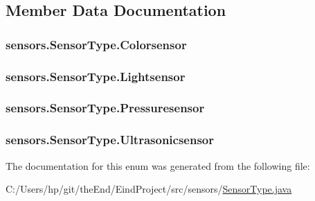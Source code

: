 \subsection{Member Data Documentation}
\hypertarget{enumsensors_1_1_sensor_type_a56c9a2b279f1d909323b79f8ef272ff7}{
\subsubsection[{Colorsensor}]{\setlength{\rightskip}{0pt plus 5cm}sensors.\-Sensor\-Type.\-Colorsensor}}\label{enumsensors_1_1_sensor_type_a56c9a2b279f1d909323b79f8ef272ff7}
\hypertarget{enumsensors_1_1_sensor_type_a6438e9ee7c60fcd103234e28e986c1ea}{
\subsubsection[{Lightsensor}]{\setlength{\rightskip}{0pt plus 5cm}sensors.\-Sensor\-Type.\-Lightsensor}}\label{enumsensors_1_1_sensor_type_a6438e9ee7c60fcd103234e28e986c1ea}
\hypertarget{enumsensors_1_1_sensor_type_ad4009ea0d42269e90107270a4eaeb372}{
\subsubsection[{Pressuresensor}]{\setlength{\rightskip}{0pt plus 5cm}sensors.\-Sensor\-Type.\-Pressuresensor}}\label{enumsensors_1_1_sensor_type_ad4009ea0d42269e90107270a4eaeb372}
\hypertarget{enumsensors_1_1_sensor_type_a850fa290a12e42dafa929ff12bdcf574}{
\subsubsection[{Ultrasonicsensor}]{\setlength{\rightskip}{0pt plus 5cm}sensors.\-Sensor\-Type.\-Ultrasonicsensor}}\label{enumsensors_1_1_sensor_type_a850fa290a12e42dafa929ff12bdcf574}


The documentation for this enum was generated from the following file\-:\begin{DoxyCompactItemize}
\item 
C\-:/\-Users/hp/git/the\-End/\-Eind\-Project/src/sensors/\hyperlink{_sensor_type_8java}{Sensor\-Type.\-java}\end{DoxyCompactItemize}
